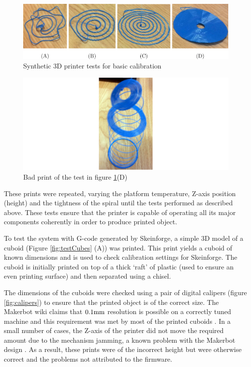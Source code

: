 			\begin{figure}
				\includegraphics[width=1\textwidth]{diagrams/syntheticTests.pdf}
				\caption{Synthetic 3D printer tests for basic calibration}
				\label{fig:syntheticTests}
			\end{figure}
			
			\begin{figure}
				\includegraphics[width=1\textwidth]{diagrams/looseSpiral.pdf}
				\caption{Bad print of the test in figure \ref{fig:syntheticTests}(D)}
				\label{fig:looseSpiral}
			\end{figure}
			
			These prints were repeated, varying the platform temperature, Z-axis
			position (height) and the tightness of the spiral until the tests
			performed as described above. These tests ensure that the printer is
			capable of operating all its major components coherently in order to
			produce printed object.
			
			To test the system with G-code generated by Skeinforge, a simple 3D model
			of a cuboid (Figure \ref{fig:testCubes} (A)) was printed. This print
			yields a cuboid of known dimensions and is used to check calibration
			settings for Skeinforge. The cuboid is initially printed on top of a thick
			`raft' of plastic (used to ensure an even printing surface) and then
			separated using a chisel.
			
			The dimensions of the cuboids were checked using a pair of digital
			calipers (figure \ref{fig:calipers}) to ensure that the printed object is
			of the correct size. The Makerbot wiki claims that $0.1\textrm{mm}$ resolution is
			possible on a correctly tuned machine and this requirement was met by most
			of the printed cuboids \cite{makerbotfaq}. In a small number of cases, the
			Z-axis of the printer did not move the required amount due to the
			mechanism jamming, a known problem with the Makerbot design
			\cite{zaxisissue}. As a result, these prints were of the incorrect height
			but were otherwise correct and the problems not attributed to the
			firmware.
			
